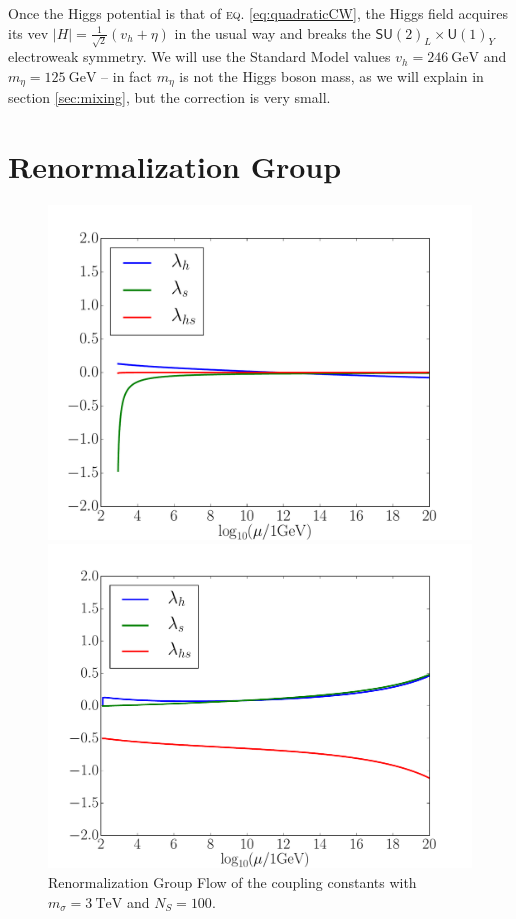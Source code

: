 \documentclass[aps,prd,preprintnumbers,nofootinbibn,twocolumn]{revtex4}
\begin{document}
Once the Higgs potential is that of \textsc{eq.} \eqref{eq:quadraticCW}, the Higgs field acquires its vev $|H| = \frac{1}{\sqrt{2}}( v_h + \eta)$ in the usual way and breaks the $\mathsf{SU}(2)_L\times \mathsf{U}(1)_Y$ electroweak symmetry. We will use the Standard Model values $v_h = \SI{246}{\giga\electronvolt}$ and $m_\eta = \SI{125}{\giga\electronvolt}$ -- in fact $m_\eta$ is not the Higgs boson mass, as we will explain in section \ref{sec:mixing}, but the correction is very small.

\section{Renormalization Group}\label{sect:RG}
\begin{figure}[t]
\centering
\begin{minipage}[b]{0.49\textwidth}
\includegraphics[width=\columnwidth]{scenario1}
\caption{Renormalization Group Flow of the coupling constants with $m_\sigma = \SI{3}{\tera\electronvolt}$ and $N_S=100$.}\label{fig:sce1}
\end{minipage}
\hfill
\begin{minipage}[b]{0.49\textwidth}
\includegraphics[width=\columnwidth]{scenario2}

\end{minipage}
\end{figure}
\end{document}
